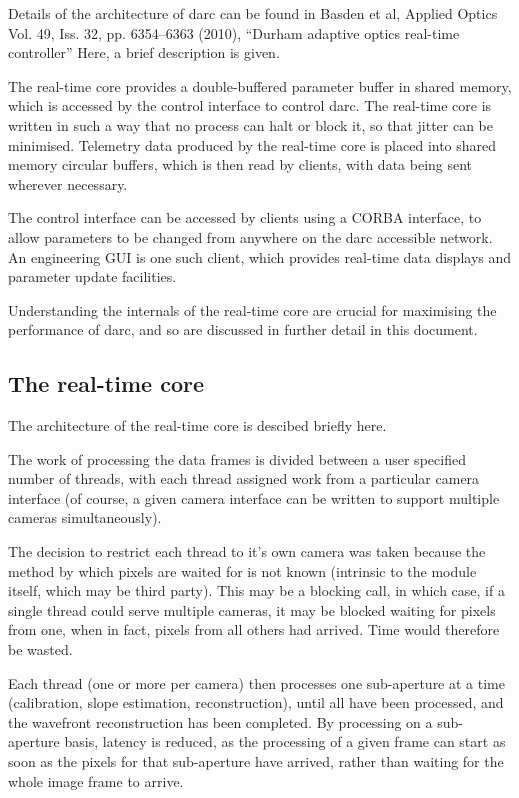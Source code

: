 \documentclass[a4,10pt]{article}
\begin{document}
Details of the architecture of darc can be found in Basden et al,
Applied Optics Vol. 49, Iss. 32, pp. 6354–6363 (2010), ``Durham
adaptive optics real-time controller''
Here, a brief description is given.

The real-time core provides a double-buffered parameter buffer in
shared memory, which is accessed by the control interface to control
darc.  The real-time core is written in such a way that no process can
halt or block it, so that jitter can be minimised.  Telemetry data
produced by the real-time core is placed into shared memory circular
buffers, which is then read by clients, with data being sent wherever
necessary.  

The control interface can be accessed by clients using a CORBA
interface, to allow parameters to be changed from anywhere on the darc
accessible network.  An engineering GUI is one such client, which
provides real-time data displays and parameter update facilities.  

Understanding the internals of the real-time core are crucial for
maximising the performance of darc, and so are discussed in further
detail in this document.  

\subsection{The real-time core}

The architecture of the real-time core is descibed briefly here.

The work of processing the data frames is divided between a user
specified number of threads, with each thread assigned work from a
particular camera interface (of course, a given camera interface can
be written to support multiple cameras simultaneously).

The decision to restrict each thread to it's own camera was taken
because the method by which pixels are waited for is not known
(intrinsic to the module itself, which may be third party).  This
may be a blocking call, in which case, if a single thread could serve
multiple cameras, it may be blocked waiting for pixels from one, when
in fact, pixels from all others had arrived.  Time would therefore be
wasted. 

Each thread (one or more per camera) then processes one sub-aperture
at a time (calibration, slope estimation, reconstruction), until all
have been processed, and the wavefront reconstruction has been
completed.  By processing on a sub-aperture basis, latency is reduced,
as the processing of a given frame can start as soon as the pixels for
that sub-aperture have arrived, rather than waiting for the whole
image frame to arrive.  
\end{document}
